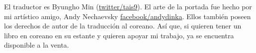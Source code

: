 El traductor es Byungho Min (\href{http://go.yurichev.com/17344}{twitter/tais9}).
El arte de la portada fue hecho por mi art\'istico amigo, Andy Nechaevsky
\href{http://go.yurichev.com/17023}{facebook/andydinka}.
Ellos tambi\'en poseen los derechos de autor de la traducci\'on al coreano.
As\'i que, si quieren tener un libro  en coreano en su estante
y quieren apoyar mi trabajo, ya se encuentra disponible a la venta.
